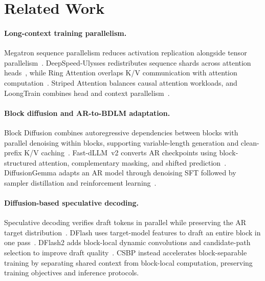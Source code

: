 \section{Related Work}
\label{sec:related-work}

\paragraph{Long-context training parallelism.}
Megatron sequence parallelism reduces activation replication alongside
tensor parallelism~\citep{korthikanti2022recomputation}.
DeepSpeed-Ulysses redistributes sequence shards across attention
heads~\citep{jacobs2023ulysses}, while Ring Attention overlaps K/V
communication with attention computation~\citep{liu2023ringattention}.
Striped Attention balances causal attention workloads, and LoongTrain
combines head and context parallelism~\citep{brandon2023striped,gu2024loongtrain}.

\paragraph{Block diffusion and AR-to-BDLM adaptation.}
Block Diffusion combines autoregressive dependencies between blocks with
parallel denoising within blocks, supporting variable-length generation
and clean-prefix K/V caching~\citep{arriola2025blockdiffusion}.
Fast-dLLM~v2 converts AR checkpoints using block-structured attention,
complementary masking, and shifted prediction~\citep{wu2025fastdllmv2}.
DiffusionGemma adapts an AR model through denoising SFT followed by sampler
distillation and reinforcement learning~\citep{diffusiongemma2026report}.

\paragraph{Diffusion-based speculative decoding.}
Speculative decoding verifies draft tokens in parallel while preserving
the AR target distribution~\citep{leviathan2023speculative}.
DFlash uses target-model features to draft an entire block in one
pass~\citep{chen2026dflash}. DFlash2 adds block-local dynamic convolutions
and candidate-path selection to improve draft
quality~\citep{inco2026dflash2}.
CSBP instead accelerates block-separable training by separating shared
context from block-local computation, preserving training objectives and
inference protocols.
